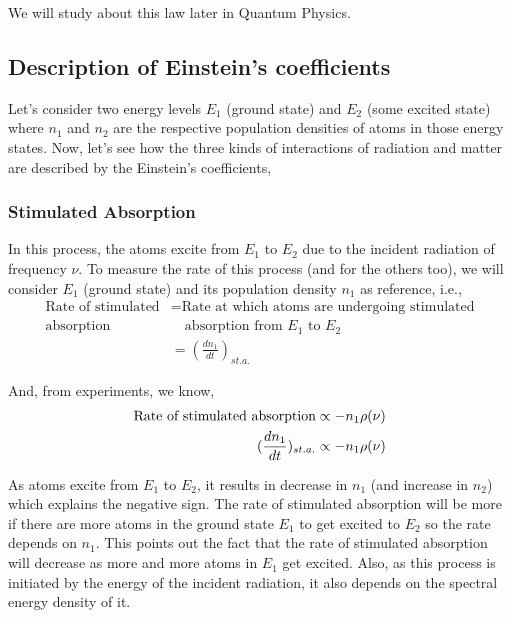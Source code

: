 \documentclass[12pt]{article}
\begin{document}
We will study about this law later in Quantum Physics.

\subsection{Description of Einstein's coefficients}

Let's consider two energy levels $E_{1}$ (ground state) and $E_{2}$ (some excited state) where $n_{1}$ and $n_{2}$ are the respective population densities of atoms in those energy states. Now, let's see how the three kinds of interactions of radiation and matter are described by the Einstein's coefficients,

\subsubsection{Stimulated Absorption}

In this process, the atoms excite from $E_{1}$ to $E_{2}$ due to the incident radiation of frequency $\nu$. To measure the rate of this process (and for the others too), we will consider $E_{1}$ (ground state) and its population density $n_{1}$ as reference, i.e.,
\begin{align*}
    \text{Rate of stimulated} & = \text{Rate at which atoms are undergoing stimulated} \\
    \text{absorption} & \quad \text{absorption from } E_{1} \text{ to } E_{2} \\ 
    & = (\frac{dn_{1}}{dt})_{st.a.}
\end{align*}

And, from experiments, we know, 
\begin{align*}
    \textnormal{Rate of stimulated absorption} \propto -n_{1}\rho(\nu) \\ 
    (\frac{dn_{1}}{dt})_{st.a.} \propto -n_{1}\rho(\nu)
\end{align*}

As atoms excite from $E_{1}$ to $E_{2}$, it results in decrease in $n_{1}$ (and increase in $n_{2}$) which explains the negative sign. The rate of stimulated absorption will be more if there are more atoms in the ground state $E_{1}$ to get excited to $E_{2}$ so the rate depends on $n_{1}$. This points out the fact that the rate of stimulated absorption will decrease as more and more atoms in $E_{1}$ get excited. Also, as this process is initiated by the energy of the incident radiation, it also depends on the spectral energy density of it. \vspace{.2cm}
\end{document}
